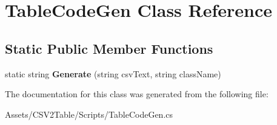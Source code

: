 \hypertarget{class_table_code_gen}{}\section{Table\+Code\+Gen Class Reference}
\label{class_table_code_gen}
\subsection*{Static Public Member Functions}
\begin{DoxyCompactItemize}
\item 
static string {\bfseries Generate} (string csv\+Text, string class\+Name)\hypertarget{class_table_code_gen_a35fdf1c83c88389ae0a4e377c34f1a2e}{}\label{class_table_code_gen_a35fdf1c83c88389ae0a4e377c34f1a2e}

\end{DoxyCompactItemize}


The documentation for this class was generated from the following file\+:\begin{DoxyCompactItemize}
\item 
Assets/\+C\+S\+V2\+Table/\+Scripts/Table\+Code\+Gen.\+cs\end{DoxyCompactItemize}
